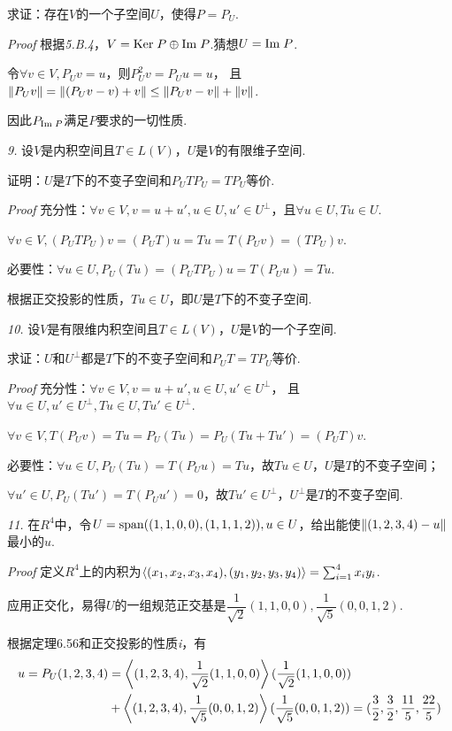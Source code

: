 求证：存在\(V\)的一个子空间\(U\)，使得\(P=P_U\).

\textit{Proof}
根据\textit{5.B.4}，\(V= \mathrm{Ker \;} P \oplus \mathrm{Im \;} P\).猜想\(U=\mathrm{Im \;} P\).

令\(\forall v \in V,P_U v=u\)，则\(P_U^2 v=P_U u=u\)，
且\(\left\lVert P_U v \right\rVert=\left\lVert (P_U v-v)+v \right\rVert \leq \left\lVert P_U v-v \right\rVert+\left\lVert v \right\rVert\).

因此\(P_{\mathrm{Im \;} P}\)满足\(P\)要求的一切性质.

\hspace*{\fill}

\textit{9.}
设\(V\)是内积空间且\(T \in L(V)\)，\(U\)是\(V\)的有限维子空间.

证明：\(U\)是\(T\)下的不变子空间和\(P_U T P_U=T P_U\)等价.

\textit{Proof}
充分性：\(\forall v \in V,v=u+u',u \in U,u' \in U^\bot\)，且\(\forall u \in U,Tu \in U\).

\(\forall v \in V,(P_U T P_U)v=(P_U T)u=Tu=T(P_U v)=(T P_U)v\).

必要性：\(\forall u \in U,P_U(Tu)=(P_U T P_U)u=T(P_U u)=Tu\).

根据正交投影的性质，\(Tu \in U\)，即\(U\)是\(T\)下的不变子空间.

\newpage

\textit{10.}
设\(V\)是有限维内积空间且\(T \in L(V)\)，\(U\)是\(V\)的一个子空间.

求证：\(U\)和\(U^\bot\)都是\(T\)下的不变子空间和\(P_U T=T P_U\)等价.

\textit{Proof}
充分性：\(\forall v \in V,v=u+u',u \in U,u' \in U^\bot\)，
且\(\forall u \in U,u' \in U^\bot,Tu \in U,Tu' \in U^\bot\).

\(\forall v \in V,T(P_U v)=Tu=P_U(Tu)=P_U(Tu+Tu')=(P_U T)v\).

必要性：\(\forall u \in U,P_U(Tu)=T(P_U u)=Tu\)，故\(Tu \in U\)，\(U\)是\(T\)的不变子空间；

\(\forall u' \in U,P_U(Tu')=T(P_U u')=0\)，故\(Tu' \in U^\bot\)，\(U^\bot\)是\(T\)的不变子空间.

\hspace*{\fill}

\textit{11.}
在\(R^4\)中，令\(U=\mathrm{span}((1,1,0,0),(1,1,1,2)),u \in U\)，给出能使\(\left\lVert (1,2,3,4)-u \right\rVert\)最小的\(u\).

\textit{Proof}
定义\(R^4\)上的内积为\(\left\langle (x_1,x_2,x_3,x_4),(y_1,y_2,y_3,y_4) \right\rangle=\sum_{i=1}^4 x_iy_i\).

应用正交化，易得\(U\)的一组规范正交基是\(\dfrac{1}{\sqrt{2}}(1,1,0,0),\dfrac{1}{\sqrt{5}}(0,0,1,2)\).

根据定理6.56和正交投影的性质\textit{i}，有
    \begin{align*}
        u=P_U(1,2,3,4)&=\left\langle (1,2,3,4),\dfrac{1}{\sqrt{2}}(1,1,0,0) \right\rangle(\dfrac{1}{\sqrt{2}}(1,1,0,0)) \\
        &+\left\langle (1,2,3,4),\dfrac{1}{\sqrt{5}}(0,0,1,2) \right\rangle(\dfrac{1}{\sqrt{5}}(0,0,1,2))
        =(\dfrac{3}{2},\dfrac{3}{2},\dfrac{11}{5},\dfrac{22}{5})
    \end{align*}

